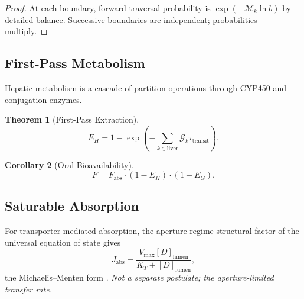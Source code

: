 \documentclass[twocolumn,10pt,a4paper]{article}
\newtheorem{theorem}{Theorem}[section]
\newtheorem{corollary}[theorem]{Corollary}
\theoremstyle{definition}
\theoremstyle{remark}
\newcommand{\Depth}{\mathcal{M}}
\newcommand{\Gcond}{\mathcal{G}}
\begin{document}
\begin{proof}
At each boundary, forward traversal probability is $\exp(-\Depth_k\ln b)$ by detailed balance. Successive boundaries are independent; probabilities multiply.
\end{proof}

\subsection{First-Pass Metabolism}

Hepatic metabolism is a cascade of partition operations through CYP450 and conjugation enzymes.

\begin{theorem}[First-Pass Extraction]
\label{thm:firstpass}
\begin{equation}
    E_H = 1 - \exp\left(-\sum_{k\in\mathrm{liver}}\Gcond_k\tau_{\mathrm{transit}}\right).
\end{equation}
\end{theorem}

\begin{corollary}[Oral Bioavailability]
\begin{equation}
    F = F_{\mathrm{abs}}\cdot(1-E_H)\cdot(1-E_G).
\end{equation}
\end{corollary}

\subsection{Saturable Absorption}

For transporter-mediated absorption, the aperture-regime structural factor of the universal equation of state gives
\begin{equation}
    J_{\mathrm{abs}} = \frac{V_{\max}[D]_{\mathrm{lumen}}}{K_T + [D]_{\mathrm{lumen}}},
    \label{eq:MM}
\end{equation}
the Michaelis--Menten form \citep{michaelis_menten_1913,briggs_haldane_1925}. \emph{Not a separate postulate; the aperture-limited transfer rate.}
\end{document}
